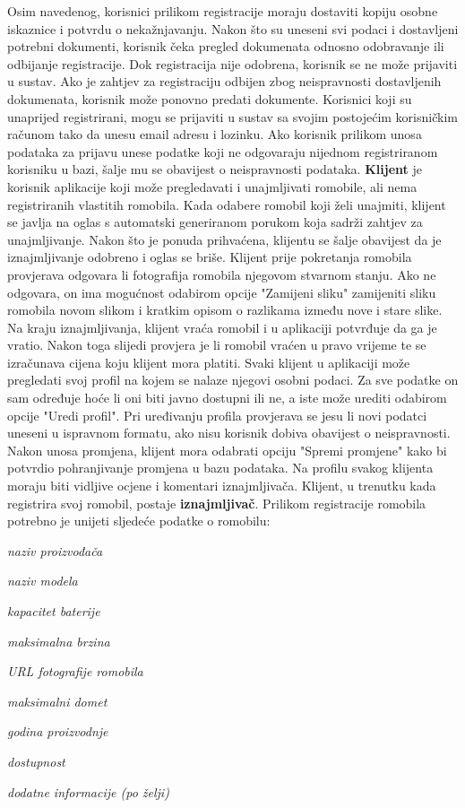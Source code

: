 		Osim navedenog, korisnici prilikom registracije moraju dostaviti kopiju osobne iskaznice i potvrdu o nekažnjavanju. Nakon što su uneseni svi podaci i dostavljeni potrebni dokumenti, korisnik čeka pregled dokumenata odnosno odobravanje ili odbijanje registracije. Dok registracija nije odobrena, korisnik se ne može prijaviti u sustav. Ako je zahtjev za registraciju odbijen zbog neispravnosti dostavljenih dokumenata, korisnik može ponovno predati dokumente. Korisnici koji su unaprijed registrirani, mogu se prijaviti u sustav sa svojim postojećim korisničkim računom tako da unesu email adresu i lozinku. Ako korisnik prilikom unosa podataka za prijavu unese podatke koji ne odgovaraju nijednom registriranom korisniku u bazi, šalje mu se obavijest o neispravnosti podataka. \textbf{Klijent} je korisnik aplikacije koji može pregledavati i unajmljivati romobile, ali nema registriranih vlastitih romobila. Kada odabere romobil koji želi unajmiti, klijent se javlja na oglas s automatski generiranom porukom koja sadrži zahtjev za unajmljivanje. Nakon što je ponuda prihvaćena, klijentu se šalje obavijest da je iznajmljivanje odobreno i oglas se briše. Klijent prije pokretanja romobila provjerava odgovara li fotografija romobila njegovom stvarnom stanju. Ako ne odgovara, on ima mogućnost odabirom opcije "Zamijeni sliku" zamijeniti sliku romobila novom slikom i kratkim opisom o razlikama između nove i stare slike. Na kraju iznajmljivanja, klijent vraća romobil i u aplikaciji potvrđuje da ga je vratio. Nakon toga slijedi provjera je li romobil vraćen u pravo vrijeme te se izračunava cijena koju klijent mora platiti. Svaki klijent u aplikaciji može pregledati svoj profil na kojem se nalaze njegovi osobni podaci. Za sve podatke on sam određuje hoće li oni biti javno dostupni ili ne, a iste može urediti odabirom opcije "Uredi profil".  Pri uređivanju profila provjerava se jesu li novi podatci uneseni u ispravnom formatu, ako nisu korisnik dobiva obavijest o neispravnosti. Nakon unosa promjena, klijent mora odabrati opciju "Spremi promjene" kako bi potvrdio pohranjivanje promjena u bazu podataka. Na profilu svakog klijenta moraju biti vidljive ocjene i komentari iznajmljivača. Klijent, u trenutku kada registrira svoj romobil, postaje \textbf{iznajmljivač}. Prilikom registracije romobila potrebno je unijeti sljedeće podatke o romobilu: 
		
			\begin{packed_item}
			\item \textit{naziv proizvođača}
			\item \textit{naziv modela}
			\item \textit{kapacitet baterije}
			\item \textit{maksimalna brzina}
			\item \textit{URL fotografije romobila}
			\item \textit{maksimalni domet}
			\item \textit{godina proizvodnje}
			\item \textit{dostupnost}
			\item \textit{dodatne informacije (po želji)}
			\end{packed_item}
			
